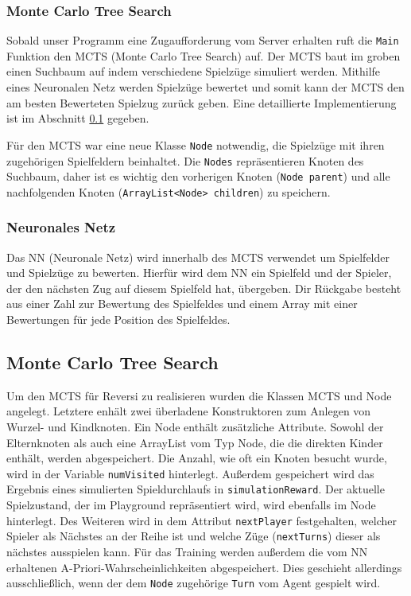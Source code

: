 \documentclass[12pt,a4paper]{article}
\begin{document}
\subsubsection{Monte Carlo Tree Search}
Sobald unser Programm eine Zugaufforderung vom Server erhalten ruft die \texttt{Main} Funktion den MCTS (Monte Carlo Tree Search) auf. Der MCTS baut im groben einen Suchbaum auf indem verschiedene Spielzüge simuliert werden. Mithilfe eines Neuronalen Netz werden Spielzüge bewertet und somit kann der MCTS den am besten Bewerteten Spielzug zurück geben. Eine detaillierte Implementierung ist im Abschnitt \ref{MCTS} gegeben.

Für den MCTS war eine neue Klasse \texttt{Node} notwendig, die Spielzüge mit ihren zugehörigen Spielfeldern beinhaltet. Die \texttt {Nodes} repräsentieren Knoten des Suchbaum, daher ist es wichtig den vorherigen Knoten (\texttt{Node parent}) und alle nachfolgenden Knoten (\texttt{ArrayList<Node> children}) zu speichern.

\subsubsection{Neuronales Netz}
Das NN (Neuronale Netz) wird innerhalb des MCTS verwendet um Spielfelder und Spielzüge zu bewerten. Hierfür wird dem NN ein Spielfeld und der Spieler, der den nächsten Zug auf diesem Spielfeld hat, übergeben. Dir Rückgabe besteht aus einer Zahl zur Bewertung des Spielfeldes und einem Array mit einer Bewertungen für jede Position des Spielfeldes. 


\subsection{Monte Carlo Tree Search}\label{MCTS}
Um den MCTS für Reversi zu realisieren wurden die Klassen MCTS und Node angelegt. Letztere enhält zwei überladene Konstruktoren zum Anlegen von Wurzel- und Kindknoten. Ein Node enthält zusätzliche Attribute. Sowohl der Elternknoten als auch eine ArrayList vom Typ Node, die die direkten Kinder enthält, werden abgespeichert. Die Anzahl, wie oft ein Knoten besucht wurde, wird in der Variable \texttt{numVisited} hinterlegt. Außerdem gespeichert wird das Ergebnis eines simulierten Spieldurchlaufs in \texttt{simulationReward}. Der aktuelle Spielzustand, der im Playground repräsentiert wird, wird ebenfalls im Node hinterlegt. Des Weiteren wird in dem Attribut \texttt{nextPlayer} festgehalten, welcher Spieler als Nächstes an der Reihe ist und welche Züge (\texttt{nextTurns}) dieser als nächstes ausspielen kann. Für das Training werden außerdem die vom NN erhaltenen A-Priori-Wahrscheinlichkeiten abgespeichert. Dies geschieht allerdings ausschließlich, wenn der dem \texttt{Node} zugehörige \texttt{Turn} vom Agent gespielt wird.
\end{document}
